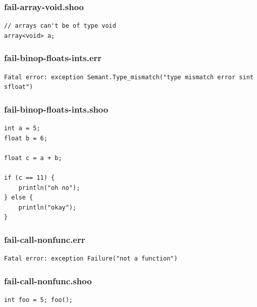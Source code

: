 \documentclass[12pt]{article}
\begin{document}
\subsubsection{fail-array-void.shoo}
\begin{mdframed}[hidealllines=true,backgroundcolor=blue!10]
\begin{lstlisting}
// arrays can't be of type void
array<void> a;
\end{lstlisting}
\end{mdframed}
\subsubsection{fail-binop-floats-ints.err}
\begin{mdframed}[hidealllines=true,backgroundcolor=green!10]
\begin{lstlisting}
Fatal error: exception Semant.Type_mismatch("type mismatch error sint sfloat")
\end{lstlisting}
\end{mdframed}
\subsubsection{fail-binop-floats-ints.shoo}
\begin{mdframed}[hidealllines=true,backgroundcolor=blue!10]
\begin{lstlisting}
int a = 5;
float b = 6;

float c = a + b;

if (c == 11) {
    println("oh no");
} else {
    println("okay");
}
\end{lstlisting}
\end{mdframed}
\subsubsection{fail-call-nonfunc.err}
\begin{mdframed}[hidealllines=true,backgroundcolor=green!10]
\begin{lstlisting}
Fatal error: exception Failure("not a function")
\end{lstlisting}
\end{mdframed}
\subsubsection{fail-call-nonfunc.shoo}
\begin{mdframed}[hidealllines=true,backgroundcolor=blue!10]
\begin{lstlisting}
int foo = 5; foo();\end{lstlisting}
\end{mdframed}
\end{document}
